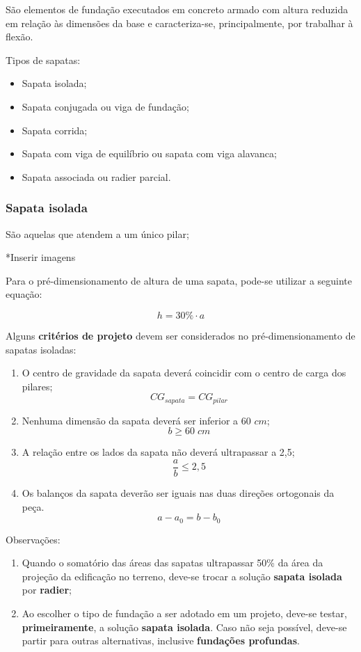 São elementos de fundação executados em concreto armado com altura reduzida em relação às dimensões da base e caracteriza-se, principalmente, por trabalhar à flexão.

Tipos de sapatas:

\begin{itemize}
	\item Sapata isolada;
	\item Sapata conjugada ou viga de fundação;
	\item Sapata corrida;
	\item Sapata com viga de equilíbrio ou sapata com viga alavanca;
	\item Sapata associada ou radier parcial.
\end{itemize}

\subsubsection{Sapata isolada}

São aquelas que atendem a um único pilar;

*Inserir imagens

Para o pré-dimensionamento de altura de uma sapata, pode-se utilizar a seguinte equação:

\begin{equation}
	h=30\%\cdot a
\end{equation}

Alguns \textbf{critérios de projeto} devem ser considerados no pré-dimensionamento de sapatas isoladas:

\begin{enumerate}
	\item O centro de gravidade da sapata deverá coincidir com o centro de carga dos pilares; $${CG}_{sapata}={CG}_{pilar}$$
	\item Nenhuma dimensão da sapata deverá ser inferior a 60 $cm$; $$b\geqslant60\;cm$$
	\item A relação entre os lados da sapata não deverá ultrapassar a 2,5; $$\frac{a}{b}\leqslant2,5$$
	\item Os balanços da sapata deverão ser iguais nas duas direções ortogonais da peça. $$a-a_0=b-b_0$$
\end{enumerate}

Observações:

\begin{enumerate}
	\item Quando o somatório das áreas das sapatas ultrapassar 50\% da área da projeção da edificação no terreno, deve-se trocar a solução \textbf{sapata isolada} por \textbf{radier};
	\item Ao escolher o tipo de fundação a ser adotado em um projeto, deve-se testar, \textbf{primeiramente}, a solução \textbf{sapata isolada}. Caso não seja possível, deve-se partir para outras alternativas, inclusive \textbf{fundações profundas}.
\end{enumerate}

